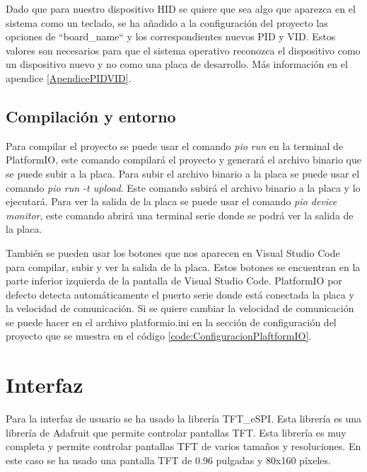 \begin{tcolorbox}[colback=blue!5!white, colframe=blue!55!white, title=Nota]
    Dado que para nuestro dispositivo \gls{HID} se quiere que sea algo que aparezca en el sistema como un teclado, se ha añadido a la configuración del proyecto las opciones de ``board\_name`` y los correspondientes nuevos \gls{PID} y \gls{VID}. Estos valores son necesarios para que el sistema operativo reconozca el dispositivo como un dispositivo nuevo y no como una placa de desarrollo. Más información en el apendice \ref{ApendicePIDVID}.
\end{tcolorbox}

\subsection{Compilación y entorno}

Para compilar el proyecto se puede usar el comando \textit{pio run} en la terminal de \gls{PlatformIO}, este comando compilará el proyecto y generará el archivo binario que se puede subir a la placa. Para subir el archivo binario a la placa se puede usar el comando \textit{pio run -t upload}. Este comando subirá el archivo binario a la placa y lo ejecutará. Para ver la salida de la placa se puede usar el comando \textit{pio device monitor}, este comando abrirá una terminal serie donde se podrá ver la salida de la placa.

También se pueden usar los botones que nos aparecen en Visual Studio Code para compilar, subir y ver la salida de la placa. Estos botones se encuentran en la parte inferior izquierda de la pantalla de Visual Studio Code. \gls{PlatformIO} por defecto detecta automáticamente el puerto serie donde está conectada la placa y la velocidad de comunicación. Si se quiere cambiar la velocidad de comunicación se puede hacer en el archivo platformio.ini en la sección de configuración del proyecto que se muestra en el código \ref{code:ConfiguracionPlaftformIO}.


\section{Interfaz}

Para la interfaz de usuario se ha usado la librería TFT\_eSPI. Esta librería es una librería de Adafruit que permite controlar pantallas \gls{TFT}. Esta librería es muy completa y permite controlar pantallas \gls{TFT} de varios tamaños y resoluciones. En este caso se ha usado una pantalla \gls{TFT} de 0.96 pulgadas y 80x160 píxeles.

